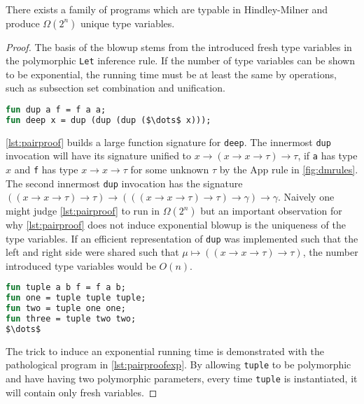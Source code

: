 \documentclass[11pt,oneside,a4paper]{report}
\begin{document}
\begin{lemma}
    There exists a family of programs which are typable in Hindley-Milner and produce $\Omega(2^n)$ unique type variables.
\end{lemma}
\begin{proof}
    The basis of the blowup stems from the introduced fresh type variables in the polymorphic \texttt{Let} inference rule.
    If the number of type variables can be shown to be exponential, the running time must be at least the same by operations, such as subsection set combination and unification.
\begin{minipage}{\textwidth}
\begin{lstlisting}[language=ML,caption={Nested dup},label={lst:pairproof},mathescape=true]
fun dup a f = f a a;
fun deep x = dup (dup (dup ($\dots$ x)));
\end{lstlisting}
\end{minipage}
    \autoref{lst:pairproof} builds a large function signature for \texttt{deep}.
    The innermost \texttt{dup} invocation will have its signature unified to $x \rightarrow (x \rightarrow x \rightarrow \tau) \rightarrow \tau$, if \texttt{a} has type $x$ and \texttt{f} has type $x \rightarrow x \rightarrow \tau$ for some unknown $\tau$ by the App rule in \autoref{fig:dmrules}.
    The second innermost \texttt{dup} invocation has the signature $((x \rightarrow x \rightarrow \tau) \rightarrow \tau) \rightarrow (((x \rightarrow x \rightarrow \tau) \rightarrow \tau) \rightarrow \gamma) \rightarrow \gamma$.
    Naively one might judge \autoref{lst:pairproof} to run in $\Omega(2^n)$ but an important observation for why \autoref{lst:pairproof} does not induce exponential blowup is the uniqueness of the type variables.
    If an efficient representation of \texttt{dup} was implemented such that the left and right side were shared such that $\mu \mapsto ((x \rightarrow x \rightarrow \tau) \rightarrow \tau)$, the number introduced type variables would be $O(n)$.
\begin{lstlisting}[language=ML,caption={Nested tuples with different type variables},label={lst:pairproofexp},mathescape=true]
fun tuple a b f = f a b;
fun one = tuple tuple tuple;
fun two = tuple one one;
fun three = tuple two two;
$\dots$
\end{lstlisting}
    The trick to induce an exponential running time is demonstrated with the pathological program in \autoref{lst:pairproofexp}.
    By allowing \texttt{tuple} to be polymorphic and have having two polymorphic parameters, every time \texttt{tuple} is instantiated, it will contain only fresh variables.

\end{proof}
\end{document}
